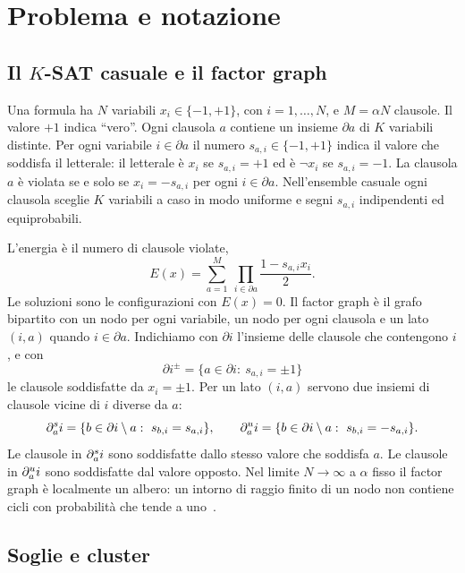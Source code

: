 \section{Problema e notazione}
\label{sec:notation}

\subsection{Il $K$-SAT casuale e il factor graph}

Una formula ha $N$ variabili $x_i\in\{-1,+1\}$, con $i=1,\dots,N$, e $M=\alpha N$ clausole.
Il valore $+1$ indica ``vero''.
Ogni clausola $a$ contiene un insieme $\partial a$ di $K$ variabili distinte.
Per ogni variabile $i\in\partial a$ il numero $s_{a,i}\in\{-1,+1\}$ indica il valore che soddisfa il letterale: il letterale è $x_i$ se $s_{a,i}=+1$ ed è $\neg x_i$ se $s_{a,i}=-1$.
La clausola $a$ è violata se e solo se $x_i=-s_{a,i}$ per ogni $i\in\partial a$.
Nell'ensemble casuale ogni clausola sceglie $K$ variabili a caso in modo uniforme e segni $s_{a,i}$ indipendenti ed equiprobabili.

L'energia è il numero di clausole violate,
\begin{equation}
E(x)=\sum_{a=1}^{M}\ \prod_{i\in\partial a}\frac{1-s_{a,i}x_i}{2}.
\label{eq:energy}
\end{equation}
Le soluzioni sono le configurazioni con $E(x)=0$.
Il factor graph è il grafo bipartito con un nodo per ogni variabile, un nodo per ogni clausola e un lato $(i,a)$ quando $i\in\partial a$.
Indichiamo con $\partial i$ l'insieme delle clausole che contengono $i$, e con
\begin{equation}
\partial i^{\pm}=\{a\in\partial i:\ s_{a,i}=\pm1\}
\end{equation}
le clausole soddisfatte da $x_i=\pm1$.
Per un lato $(i,a)$ servono due insiemi di clausole vicine di $i$ diverse da $a$:
\begin{equation}
\us=\{b\in\partial i\setminus a:\ s_{b,i}=s_{a,i}\},\qquad
\uu=\{b\in\partial i\setminus a:\ s_{b,i}=-s_{a,i}\}.
\label{eq:su-sets}
\end{equation}
Le clausole in $\partial^{s}_{a} i$ sono soddisfatte dallo stesso valore che soddisfa $a$.
Le clausole in $\partial^{u}_{a} i$ sono soddisfatte dal valore opposto.
Nel limite $N\to\infty$ a $\alpha$ fisso il factor graph è localmente un albero: un intorno di raggio finito di un nodo non contiene cicli con probabilità che tende a uno~\citep{mezard2009information}.

\subsection{Soglie e cluster}


